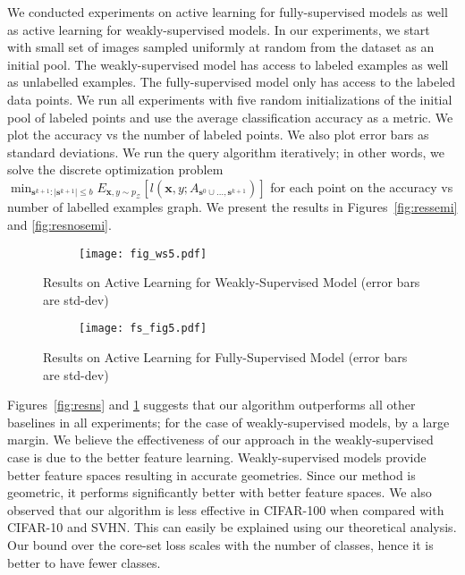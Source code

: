 \documentclass{article} \usepackage{iclr2018_conference,times}
\begin{document}
We conducted experiments on active learning for fully-supervised models as well as active learning for weakly-supervised
models. In our experiments, we start with small set of images sampled uniformly at random from the dataset as an initial
pool. The weakly-supervised model has access to labeled examples as well as unlabelled examples. The fully-supervised
model only has access to the labeled data points. We run all experiments with five random initializations of the initial
pool of labeled points and use the average classification accuracy as a metric. We plot the accuracy vs the number of
labeled points. We also plot error bars as standard deviations. We run the query algorithm iteratively; in other
words, we solve the discrete optimization problem $\min_{\mathbf{s}^{k+1} : |\mathbf{s}^{k+1}| \leq b} E_{\mathbf{x},y
\sim p_\mathcal{Z}} [l(\mathbf{x},y; A_{\mathbf{s}^{0} \cup \ldots, \mathbf{s}^{k+1}})]$ for each point on the accuracy
vs number of labelled examples graph. We present the results in Figures~\ref{fig:ressemi} and \ref{fig:resnosemi}.

\begin{figure}[tb]
    \centering
    \begin{subfigure}[b]{\textwidth}
        \texttt{[image: fig\_ws5.pdf]}
    \end{subfigure}
    \vspace{-5mm}
    \caption{Results on Active Learning for Weakly-Supervised Model (error bars are std-dev)}\label{fig:ressemi}
        \vspace{-3mm}
    \label{fig:resns}
\vspace{5mm}
    \begin{subfigure}[b]{\textwidth}
        \texttt{[image: fs\_fig5.pdf]}
    \end{subfigure}
        \vspace{-5mm}
    \caption{Results on Active Learning for Fully-Supervised Model (error bars are std-dev)}\label{fig:resnosemi}
        \vspace{-5mm}
    \label{fig:ress}
\end{figure}

Figures~\ref{fig:resns} and \ref{fig:ress} suggests that our algorithm outperforms all other baselines in all
experiments; for the case of weakly-supervised models, by a large margin. We believe the effectiveness of our approach
in the weakly-supervised case is due to the better feature learning. Weakly-supervised models provide better feature
spaces resulting in accurate geometries. Since our method is geometric, it performs significantly better with better
feature spaces. We also observed that our algorithm is less effective in CIFAR-100 when compared with
CIFAR-10 and SVHN. This can easily be explained using our theoretical analysis. Our bound over the core-set loss scales with the
number of classes, hence it is better to have fewer classes.
\end{document}
